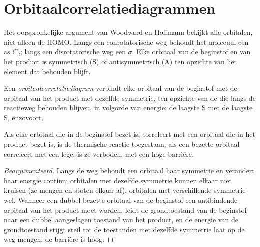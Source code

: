 \section{Orbitaalcorrelatiediagrammen}

Het oorspronkelijke argument van Woodward en Hoffmann bekijkt alle
orbitalen, niet alleen de HOMO. Langs een conrotatorische weg behoudt het
molecuul een as $C_2$; langs een
disrotatorische weg een  $\sigma$. Elke orbitaal van de beginstof en van het
product is symmetrisch (S) of antisymmetrisch (A) ten opzichte van het
element dat behouden blijft.

\begin{definition}[Orbitaalcorrelatiediagram]\label{def:b3:pericyclic:orbital-correlation}
Een \emph{orbitaalcorrelatiediagram}
verbindt elke orbitaal van de beginstof met de orbitaal van het product
met dezelfde symmetrie, ten opzichte van de  die langs
de reactieweg behouden blijven, in volgorde van energie: de laagste S
met de laagste S, enzovoort.
\end{definition}

\begin{proposition}\label{prop:b3:pericyclic:correlation}
Als elke orbitaal die in de beginstof bezet is, correleert met een
orbitaal die in het product bezet is, is de thermische reactie
toegestaan; als een bezette orbitaal correleert met een lege, is ze
verboden, met een hoge barrière.
\end{proposition}

\begin{proof}[Beargumenteerd]
Langs de weg behoudt een orbitaal haar symmetrie en verandert haar
energie continu; orbitalen met dezelfde symmetrie kunnen elkaar niet
kruisen (ze mengen en stoten elkaar af), orbitalen met verschillende
symmetrie wel. Wanneer een dubbel bezette orbitaal van de beginstof een
antibindende orbitaal van het product moet worden, leidt de
grondtoestand van de beginstof naar een dubbel aangeslagen toestand van
het product, en de energie van de grondtoestand stijgt steil tot de
toestanden met dezelfde symmetrie laat op de weg mengen: de barrière is
hoog.
\end{proof}


